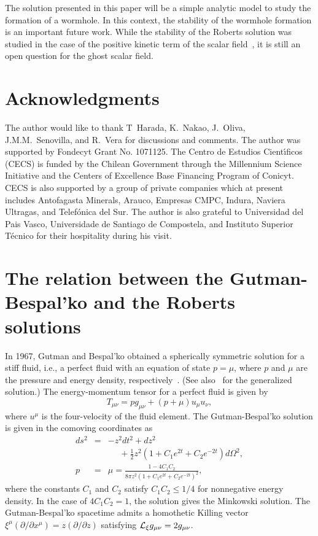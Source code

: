 \documentclass[aps,prd,twocolumn,eqsecnum,showpacs,amsmath]{revtex4}
\begin{document}
The solution presented in this paper will be a simple analytic model to study the formation of a wormhole.
In this context, the stability of the wormhole formation is an important future work.
While the stability of the Roberts solution was studied in the case of the positive kinetic term of the scalar field~\cite{frolov1997}, it is still an open question for the ghost scalar field.






\section*{Acknowledgments}
The author would like to thank T~Harada, K.~Nakao, J.~Oliva, J.M.M.~Senovilla, and R.~Vera for discussions and comments. 
The author was supported by Fondecyt Grant No. 1071125.
The Centro de Estudios Cient\'{\i}ficos (CECS) is funded by the Chilean
Government through the Millennium Science Initiative and the Centers of
Excellence Base Financing Program of Conicyt. CECS is also supported by a
group of private companies which at present includes Antofagasta Minerals,
Arauco, Empresas CMPC, Indura, Naviera Ultragas, and Telef\'{o}nica del Sur.
The author is also grateful to Universidad del Pais Vasco, Universidade de Santiago de Compostela, and Instituto Superior T{\'e}cnico for their hospitality during his visit.



\appendix
\section{The relation between the Gutman-Bespal'ko and the Roberts solutions}
In 1967, Gutman and Bespal'ko obtained a spherically symmetric solution for a stiff fluid, i.e., a perfect fluid with an equation of state $p=\mu$, where $p$ and $\mu$ are the pressure and energy density, respectively~\cite{gb1967}.
(See also~\cite{wesson1978,krasinski} for the generalized solution.)
The energy-momentum tensor for a perfect fluid is given by 
\begin{equation}
T_{\mu\nu}=pg_{\mu\nu}+(p+\mu)u_\mu u_\nu, \label{pf}
\end{equation}
where $u^\mu$ is the four-velocity of the fluid element.
The Gutman-Bespal'ko solution is given in the comoving coordinates as
\begin{eqnarray}
ds^2&=&-z^2dt^2+dz^2 \nonumber \\
&&~~~~~~+\frac12 z^2(1+C_1e^{2t}+C_2e^{-2t})d\Omega^2, \label{gb} \\
p&=&\mu=\frac{1-4C_1C_2}{8\pi z^2(1+C_1e^{2t}+C_2e^{-2t})^2},\label{sol2}
\end{eqnarray}
where the constants $C_1$ and $C_2$ satisfy $C_1C_2 \le 1/4$ for nonnegative energy density.
In the case of $4C_1C_2=1$, the solution gives the Minkowski solution.
The Gutman-Bespal'ko spacetime admits a homothetic Killing vector $\xi^\mu(\partial/\partial x^\mu)=z(\partial/\partial z)$ satisfying ${\cal  L}_{\xi} g_{\mu\nu} = 2g_{\mu\nu} $.
\end{document}
